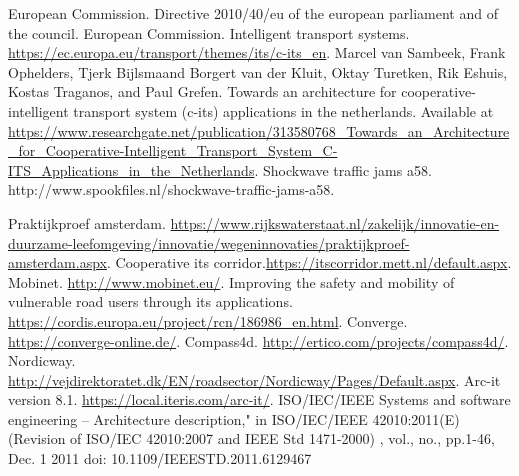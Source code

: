 \documentclass[conference]{IEEEtran}
\begin{document}
\begin{thebibliography}{00}


 European Commission. Directive 2010/40/eu of the european parliament and of the council.
 European Commission. Intelligent transport systems. \url{https://ec.europa.eu/transport/themes/its/c-its_en}.
 Marcel van Sambeek, Frank Ophelders, Tjerk Bijlsmaand Borgert van der Kluit, Oktay Turetken, Rik Eshuis, Kostas Traganos, and Paul Grefen. Towards an architecture for cooperative-intelligent transport system (c-its) applications in the netherlands. Available at \url{ https://www.researchgate.net/publication/313580768_Towards_an_Architecture_for_Cooperative-Intelligent_Transport_System_C-ITS_Applications_in_the_Netherlands}.
 Shockwave traffic jams a58. http://www.spookfiles.nl/shockwave-traffic-jams-a58.


Praktijkproef amsterdam. \url{https://www.rijkswaterstaat.nl/zakelijk/innovatie-en-duurzame-leefomgeving/innovatie/wegeninnovaties/praktijkproef-amsterdam.aspx}.
Cooperative its corridor.\url{https://itscorridor.mett.nl/default.aspx}.
Mobinet. \url{http://www.mobinet.eu/}.
Improving the safety and mobility of vulnerable road users through its applications. \url{https://cordis.europa.eu/project/rcn/186986_en.html}.
Converge. \url{https://converge-online.de/}.
Compass4d. \url{http://ertico.com/projects/compass4d/}.
 Nordicway. \url{http://vejdirektoratet.dk/EN/roadsector/Nordicway/Pages/Default.aspx}.
 Arc-it version 8.1. \url{https://local.iteris.com/arc-it/}.
 ISO/IEC/IEEE Systems and software engineering -- Architecture description," in ISO/IEC/IEEE 42010:2011(E) (Revision of ISO/IEC 42010:2007 and IEEE Std 1471-2000) , vol., no., pp.1-46, Dec. 1 2011 doi: 10.1109/IEEESTD.2011.6129467


\end{thebibliography}
\end{document}
